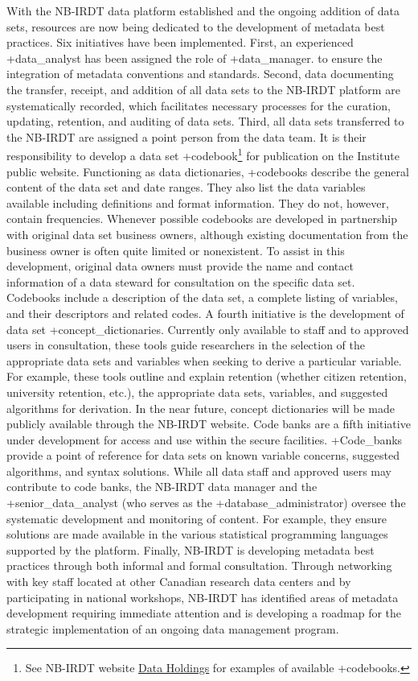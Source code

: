 \documentclass[
]{WileySix}
\begin{document}
With the NB-IRDT data platform established and the ongoing addition of data sets, resources are now being dedicated to the development of metadata best practices. Six initiatives have been implemented. First, an experienced +data\_analyst\textbar{} has been assigned the role of +data\_manager\textbar. to ensure the integration of metadata conventions and standards. Second, data documenting the transfer, receipt, and addition of all data sets to the NB-IRDT platform are systematically recorded, which facilitates necessary processes for the curation, updating, retention, and auditing of data sets. Third, all data sets transferred to the NB-IRDT are assigned a point person from the data team. It is their responsibility to develop a data set +codebook\textbar{}\footnote{See NB-IRDT website \href{https://www.nbirdt.ca/holdings}{Data Holdings} for examples of available +codebooks\textbar.} for publication on the Institute public website. Functioning as data dictionaries, +codebooks\textbar{} describe the general content of the data set and date ranges. They also list the data variables available including definitions and format information. They do not, however, contain frequencies. Whenever possible codebooks are developed in partnership with original data set business owners, although existing documentation from the business owner is often quite limited or nonexistent. To assist in this development, original data owners must provide the name and contact information of a data steward for consultation on the specific data set. Codebooks include a description of the data set, a complete listing of variables, and their descriptors and related codes. A fourth initiative is the development of data set +concept\_dictionaries\textbar. Currently only available to staff and to approved users in consultation, these tools guide researchers in the selection of the appropriate data sets and variables when seeking to derive a particular variable. For example, these tools outline and explain retention (whether citizen retention, university retention, etc.), the appropriate data sets, variables, and suggested algorithms for derivation. In the near future, concept dictionaries will be made publicly available through the NB-IRDT website. Code banks are a fifth initiative under development for access and use within the secure facilities. +Code\_banks\textbar{} provide a point of reference for data sets on known variable concerns, suggested algorithms, and syntax solutions. While all data staff and approved users may contribute to code banks, the NB-IRDT data manager and the +senior\_data\_analyst\textbar{} (who serves as the +database\_administrator\textbar) oversee the systematic development and monitoring of content. For example, they ensure solutions are made available in the various statistical programming languages supported by the platform. Finally, NB-IRDT is developing metadata best practices through both informal and formal consultation. Through networking with key staff located at other Canadian research data centers and by participating in national workshops, NB-IRDT has identified areas of metadata development requiring immediate attention and is developing a roadmap for the strategic implementation of an ongoing data management program.
\end{document}

